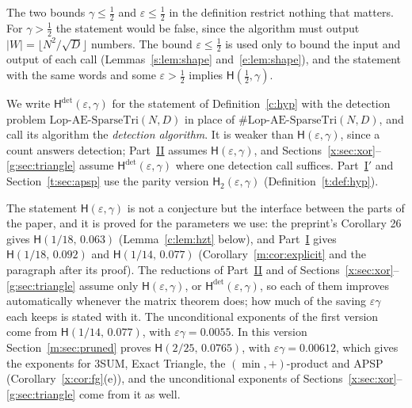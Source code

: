 \documentclass[11pt]{article}
\theoremstyle{definition}
\theoremstyle{remark}
\newcommand{\Lop}{\mathrm{Lop}\text{-}\allowbreak\mathrm{AE}\text{-}\allowbreak\mathrm{SparseTri}}
\newcommand{\Hyp}{\mathsf{H}}
\newcommand{\EpsGammaBest}{0.00612}%
\newcommand{\HypPrunedEps}{2/25}%
\newcommand{\HypPrunedGamma}{0.0765}%
\begin{document}
The two bounds $\gamma\le\frac12$ and $\varepsilon\le\frac12$ in the definition restrict nothing that matters. For $\gamma>\frac12$ the statement would be false, since the algorithm must output $|W|=\lfloor N^2/\sqrt D\rfloor$ numbers. The bound $\varepsilon\le\frac12$ is used only to bound the input and output of each call (Lemmas~\ref{s:lem:shape} and~\ref{e:lem:shape}), and the statement with the same words and some $\varepsilon>\frac12$ implies $\Hyp(\frac12,\gamma)$.

We write $\Hyp^{\det}(\varepsilon,\gamma)$ for the statement of Definition~\ref{c:hyp} with the detection problem $\Lop(N,D)$ in place of $\#\Lop(N,D)$, and call its algorithm the \emph{detection algorithm}. It is weaker than $\Hyp(\varepsilon,\gamma)$, since a count answers detection; Part~\hyperref[m:partII]{II} assumes $\Hyp(\varepsilon,\gamma)$, and Sections~\ref{x:sec:xor}--\ref{g:sec:triangle} assume $\Hyp^{\det}(\varepsilon,\gamma)$ where one detection call suffices. Part~\hyperref[t:partIp]{I$'$} and Section~\ref{t:sec:apsp} use the parity version $\Hyp_2(\varepsilon,\gamma)$ (Definition~\ref{t:def:hyp}).

The statement $\Hyp(\varepsilon,\gamma)$ is not a conjecture but the interface between the parts of the paper, and it is proved for the parameters we use: the preprint's Corollary 26 gives $\Hyp(1/18,\,0.063)$ (Lemma~\ref{c:lem:hzt} below), and Part~\hyperref[m:partI]{I} gives $\Hyp(1/18,\,0.092)$ and $\Hyp(1/14,\,0.077)$ (Corollary~\ref{m:cor:explicit} and the paragraph after its proof). The reductions of Part~\hyperref[m:partII]{II} and of Sections~\ref{x:sec:xor}--\ref{g:sec:triangle} assume only $\Hyp(\varepsilon,\gamma)$, or $\Hyp^{\det}(\varepsilon,\gamma)$, so each of them improves automatically whenever the matrix theorem does; how much of the saving $\varepsilon\gamma$ each keeps is stated with it. The unconditional exponents of the first version come from $\Hyp(1/14,\,0.077)$, with $\varepsilon\gamma=0.0055$. In this version Section~\ref{m:sec:pruned} proves $\Hyp(\HypPrunedEps,\,\HypPrunedGamma)$, with $\varepsilon\gamma=\EpsGammaBest$, which gives the exponents for 3SUM, Exact Triangle, the $(\min,+)$-product and APSP (Corollary~\ref{x:cor:fg}(e)), and the unconditional exponents of Sections~\ref{x:sec:xor}--\ref{g:sec:triangle} come from it as well.
\end{document}
